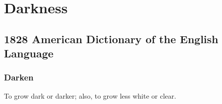 \section{Darkness}
	\label{DARKNESS}
	

\subsection{1828 American Dictionary of the English Language} %
	\label{DARKNESS-1828}
	
	\subsubsection{Darken}

		\begin{compactitem}
			\item To grow dark or darker; also, to grow less white or clear.
		\end{compactitem}


	

	
